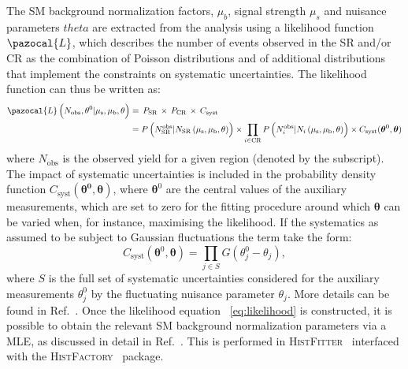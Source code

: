 	The \ac{SM} background normalization factors, $\mu_b$, signal strength $\mu_s$ and nuisance parameters $theta$ are extracted from the analysis using a likelihood function $\pazocal{L}$, which describes the number of events observed in the \ac{SR} and/or \ac{CR} as the combination of Poisson distributions and of additional distributions that implement the constraints on systematic uncertainties. The likelihood function can thus be written as:
	\begin{equation}
	\begin{split}
	\pazocal{L}\left(N_{\mathrm{obs}},\theta^0|\mu_{\mathrm{s}},\mu_{\mathrm{b}},\theta\right) & =\, P_{\mathrm{SR}}\, \times\,P_{\mathrm{CR}}\,\times\,C_{\mathrm{syst}}\\
	& = P \left( N_{\mathrm{SR}}^{\mathrm{obs}} | N_{\mathrm{SR}} \left( \mu_{\mathrm{s}}, \mu_{\mathrm{b}}, \theta\right) \right) \times \prod_{i \in \mathrm{CR}} P \left( N_i^{\mathrm{obs}} | N_i \left( \mu_\mathrm{s}, \mu_{\mathrm{b}}, \theta \right) \right)  \times  C_{\mathrm{syst}}(\bm{\theta}^0,\bm{\theta})
	\end{split}
	\label{eq:likelihood}
	\end{equation}
where $N_{\mathrm{obs}}$ is the observed yield for a given region (denoted by the subscript). 
The impact of systematic uncertainties is included in the probability density function $C_{\mathrm{syst}}(\bm{\theta^0},\bm{\theta})$, where $\bm{\theta}^0$ are the central values of the auxiliary measurements, which are set to zero for the fitting procedure around which $\bm{\theta}$ can be varied when, for instance, maximising the likelihood. 
If the systematics as assumed to be subject to Gaussian fluctuations the term take the form:
\begin{equation}
C_{\mathrm{syst}}( \bm{\theta}^0,\bm{\theta} ) = \prod_{j \in S} G (\theta_j^0-\theta_j),
\end{equation}
where $S$ is the full set of systematic uncertainties considered for the auxiliary measurements $\theta_j^0$ by the fluctuating nuisance parameter $\theta_j$. More details can be found in Ref.~\cite{histfitter,Cranmer:1456844}.
Once the likelihood equation ~\ref{eq:likelihood} is constructed, it is possible to obtain the relevant \ac{SM} background normalization parameters via a \ac{MLE}, as discussed in detail in Ref.~\cite{cowan1998statistical}. 
This is performed in \textsc{HistFitter}~\cite{histfitter} interfaced with the \textsc{HistFactory}~\cite{Cranmer:1456844} package.
